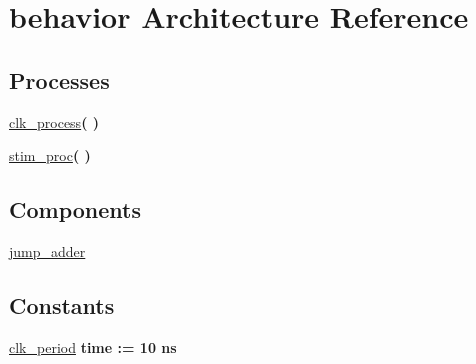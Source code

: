 \hypertarget{classjump__adder__tb_1_1behavior}{\section{behavior \-Architecture \-Reference}
\label{classjump__adder__tb_1_1behavior}
}
\*
\*
\subsection*{\-Processes}
 \begin{DoxyCompactItemize}
\item 
\hypertarget{classjump__adder__tb_1_1behavior_ac5bb218131b813f7908ec89476b31fca}{\hyperlink{classjump__adder__tb_1_1behavior_ac5bb218131b813f7908ec89476b31fca}{clk\-\_\-process}{\bfseries  (  )}}\label{classjump__adder__tb_1_1behavior_ac5bb218131b813f7908ec89476b31fca}

\item 
\hypertarget{classjump__adder__tb_1_1behavior_ad2efa6785cff833c341e27596b21aeb5}{\hyperlink{classjump__adder__tb_1_1behavior_ad2efa6785cff833c341e27596b21aeb5}{stim\-\_\-proc}{\bfseries  (  )}}\label{classjump__adder__tb_1_1behavior_ad2efa6785cff833c341e27596b21aeb5}

\end{DoxyCompactItemize}
\subsection*{\-Components}
 \begin{DoxyCompactItemize}
\item 
\hypertarget{classjump__adder__tb_1_1behavior_a37126d0718abf44f03b24857c0ce1ea0}{\hyperlink{classjump__adder__tb_1_1behavior_a37126d0718abf44f03b24857c0ce1ea0}{jump\-\_\-adder}  {\bfseries }  }\label{classjump__adder__tb_1_1behavior_a37126d0718abf44f03b24857c0ce1ea0}

\end{DoxyCompactItemize}
\subsection*{\-Constants}
 \begin{DoxyCompactItemize}
\item 
\hypertarget{classjump__adder__tb_1_1behavior_a3ffd56257467a8089d6f08ff6c8d0755}{\hyperlink{classjump__adder__tb_1_1behavior_a3ffd56257467a8089d6f08ff6c8d0755}{clk\-\_\-period} {\bfseries time  \-:=  10  ns } }\label{classjump__adder__tb_1_1behavior_a3ffd56257467a8089d6f08ff6c8d0755}

\end{DoxyCompactItemize}
